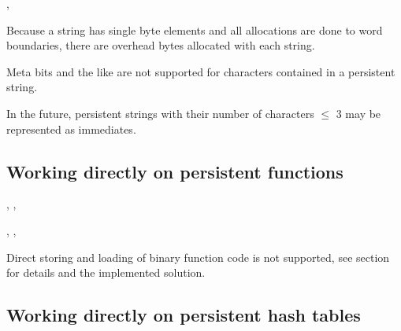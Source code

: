 \begin{NarrowRefList}
\Allocator {}
\TypePredicate {}
\ObjectStore {}
\ObjectLoad {}
\Information {},
\end{NarrowRefList}
Because a string has single byte elements and all allocations are done
to word boundaries, there are 
overhead bytes allocated with each string.

Meta bits and the like are not supported for characters contained in a
persistent string.

In the future, persistent strings with their number of characters
$\leq$ 3 may be represented as immediates.

\subsection[Persistent functions]{Working directly on persistent
  functions}

\begin{NarrowRefList}

  \Allocator {}


  \TypePredicate {}

  \ObjectStore {}

  \ObjectLoad {}

  \SlotReader {}, ,

  \SlotWriter {}, , 

\end{NarrowRefList}
Direct storing and loading of binary function code is not supported,
see section  for details and the implemented
solution.

\subsection[Persistent hash tables]{Working directly on persistent
  hash tables}

